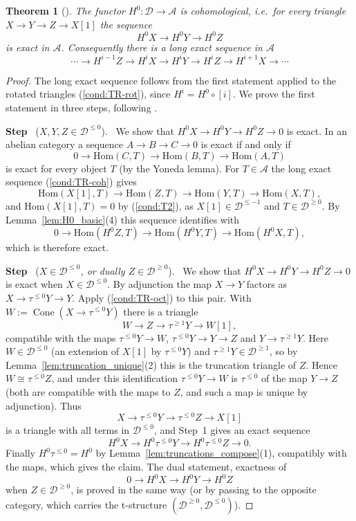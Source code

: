 \documentclass[12pt]{amsart}
\newcommand{\condref}[1]{\textup{(\ref{#1})}}
\newtheorem{theorem}{Theorem}
\numberwithin{theorem}{section}
\theoremstyle{definition}
\newcounter{pstep}
\newcommand{\step}[1]{\par\medskip\noindent\refstepcounter{pstep}\textbf{Step \thepstep}\ (\textit{#1}).\ \ignorespaces}
\newcommand{\calA}{\mathcal{A}}
\newcommand{\Hom}{\mathrm{Hom}}
\newcommand{\calD}{\mathcal{D}}
\newcommand{\Dle}[1]{\calD^{\leqslant #1}}
\newcommand{\Dge}[1]{\calD^{\geqslant #1}}
\newcommand{\Cone}{\operatorname{Cone}}
\begin{document}
	\begin{theorem}[{\cite[Th\'eor\`eme~1.3.6]{BBD82}}]
		\label{thm:H0_cohomological}
		The functor $H^0 \colon \calD \to \calA$ is cohomological, i.e.\ for every triangle $X \to Y \to Z \to X[1]$ the sequence
		\[
		H^0 X \to H^0 Y \to H^0 Z
		\]
		is exact in $\calA$.
		Consequently there is a long exact sequence in $\calA$
		\[
		\cdots \to H^{i-1} Z \to H^i X \to H^i Y \to H^i Z \to H^{i+1} X \to \cdots
		\]
	\end{theorem}
	
	\begin{proof}
		The long exact sequence follows from the first statement applied to the rotated triangles \condref{cond:TR-rot}, since $H^i = H^0 \circ [i]$.
		We prove the first statement in three steps, following \cite{BBD82}.
		
		\step{$X, Y, Z \in \Dle{0}$}
		We show that $H^0 X \to H^0 Y \to H^0 Z \to 0$ is exact.
		In an abelian category a sequence $A \to B \to C \to 0$ is exact if and only if
		\[
		0 \to \Hom(C, T) \to \Hom(B, T) \to \Hom(A, T)
		\]
		is exact for every object $T$ (by the Yoneda lemma).
		For $T \in \calA$ the long exact sequence \condref{cond:TR-coh} gives
		\[
		\Hom(X[1], T) \to \Hom(Z, T) \to \Hom(Y, T) \to \Hom(X, T) ,
		\]
		and $\Hom(X[1], T) = 0$ by \condref{cond:T2}, as $X[1] \in \Dle{-1}$ and $T \in \Dge{0}$.
		By Lemma~\ref{lem:H0_basic}(4) this sequence identifies with
		\[
		0 \to \Hom(H^0 Z, T) \to \Hom(H^0 Y, T) \to \Hom(H^0 X, T) ,
		\]
		which is therefore exact.
		
		\step{$X \in \Dle{0}$, or dually $Z \in \Dge{0}$}
		We show that $H^0 X \to H^0 Y \to H^0 Z \to 0$ is exact when $X \in \Dle{0}$.
		By adjunction the map $X \to Y$ factors as $X \to \tau^{\leqslant 0} Y \to Y$.
		Apply \condref{cond:TR-oct} to this pair.
		With $W := \Cone(X \to \tau^{\leqslant 0} Y)$ there is a triangle
		\[
		W \longrightarrow Z \longrightarrow \tau^{\geqslant 1} Y \longrightarrow W[1] ,
		\]
		compatible with the maps $\tau^{\leqslant 0} Y \to W$, $\tau^{\leqslant 0} Y \to Y \to Z$ and $Y \to \tau^{\geqslant 1} Y$.
		Here $W \in \Dle{0}$ (an extension of $X[1]$ by $\tau^{\leqslant 0} Y$) and $\tau^{\geqslant 1} Y \in \Dge{1}$, so by Lemma~\ref{lem:truncation_unique}(2) this is the truncation triangle of $Z$.
		Hence $W \cong \tau^{\leqslant 0} Z$, and under this identification $\tau^{\leqslant 0} Y \to W$ is $\tau^{\leqslant 0}$ of the map $Y \to Z$ (both are compatible with the maps to $Z$, and such a map is unique by adjunction).
		Thus 
		\[
		X \to \tau^{\leqslant 0} Y \to \tau^{\leqslant 0} Z \to X[1]
		\] 
		is a triangle with all terms in $\Dle{0}$, and Step~1 gives an exact sequence 
		\[
		H^0 X \to H^0 \tau^{\leqslant 0} Y \to H^0 \tau^{\leqslant 0} Z \to 0.
		\]
		Finally $H^0 \tau^{\leqslant 0} = H^0$ by Lemma~\ref{lem:truncations_compose}(1), compatibly with the maps, which gives the claim.
		The dual statement, exactness of 
		\[
		0 \to H^0 X \to H^0 Y \to H^0 Z
		\] 
		when $Z \in \Dge{0}$, is proved in the same way (or by passing to the opposite category, which carries the t-structure $(\Dge{0}, \Dle{0})$).
		

\end{proof}
\end{document}
